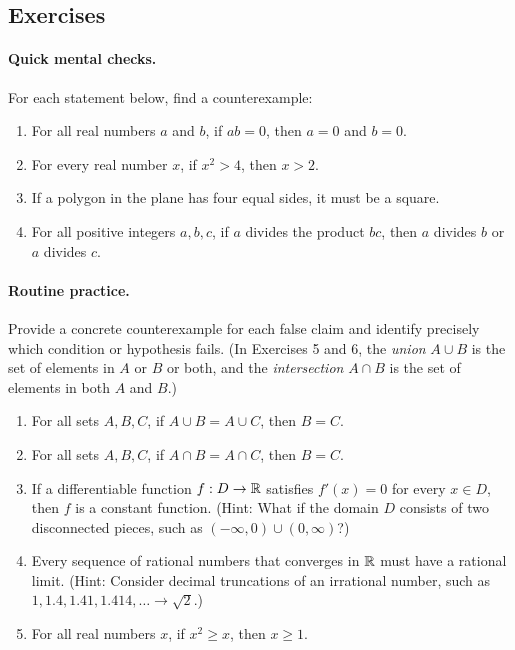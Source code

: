 \subsection{Exercises}

\paragraph{Quick mental checks.} For each statement below, find a counterexample:
\begin{enumerate}
\item For all real numbers $a$ and $b$, if $ab = 0$, then $a = 0$ and $b = 0$.
\item For every real number $x$, if $x^2 > 4$, then $x > 2$.
\item If a polygon in the plane has four equal sides, it must be a square.
\item For all positive integers $a, b, c$, if $a$ divides the product $bc$, then $a$ divides $b$ or $a$ divides $c$.
\end{enumerate}

\paragraph{Routine practice.} Provide a concrete counterexample for each false claim and identify precisely which condition or hypothesis fails. (In Exercises 5 and 6, the \emph{union} $A \cup B$ is the set of elements in $A$ or $B$ or both, and the \emph{intersection} $A \cap B$ is the set of elements in both $A$ and $B$.)
\begin{enumerate}[resume]
\item For all sets $A, B, C$, if $A \cup B = A \cup C$, then $B = C$.
\item For all sets $A, B, C$, if $A \cap B = A \cap C$, then $B = C$.
\item If a differentiable function $f : D \to \mathbb{R}$ satisfies $f'(x) = 0$ for every $x \in D$, then $f$ is a constant function. (Hint: What if the domain $D$ consists of two disconnected pieces, such as $(-\infty, 0) \cup (0, \infty)$?)
\item Every sequence of rational numbers that converges in $\mathbb{R}$ must have a rational limit. (Hint: Consider decimal truncations of an irrational number, such as $1, 1.4, 1.41, 1.414, \ldots \to \sqrt{2}$.)
\item For all real numbers $x$, if $x^2 \ge x$, then $x \ge 1$.
\end{enumerate}

